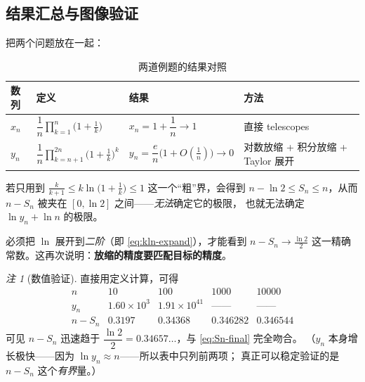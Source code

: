 \documentclass[11pt,a4paper]{ctexart}
\theoremstyle{definition}
\theoremstyle{remark}
\newtheorem*{remark}{注}
\begin{document}
\subsection{结果汇总与图像验证}

把两个问题放在一起：

\begin{table}[H]
\centering
\caption{两道例题的结果对照}
\renewcommand{\arraystretch}{1.35}
\begin{tabular}{@{}llll@{}}
\toprule
\textbf{数列} & \textbf{定义} & \textbf{结果} & \textbf{方法} \\
\midrule
$x_n$ & $\dfrac1n\displaystyle\prod_{k=1}^{n}\Big(1+\frac1k\Big)$
      & $x_n=1+\dfrac1n\to1$ & 直接 telescopes \\
$y_n$ & $\dfrac1n\displaystyle\prod_{k=n+1}^{2n}\Big(1+\frac1k\Big)^{k}$
      & $y_n=\dfrac en\big(1+O(\frac1n)\big)\to0$ & 对数放缩 + 积分放缩 + Taylor 展开 \\
\bottomrule
\end{tabular}
\end{table}

\begin{warnbox}[这道题最值得警惕的地方]
若只用到 $\frac{k}{k+1}\le k\ln\big(1+\frac1k\big)\le 1$ 这一个“粗”界，会得到
$n-\ln2\le S_n\le n$，从而 $n-S_n$ 被夹在 $[0,\ln2]$ 之间——\emph{无法}确定它的极限，
也就无法确定 $\ln y_n+\ln n$ 的极限。\par\smallskip
必须把 $\ln$ 展开到\emph{二阶}（即 \eqref{eq:kln-expand}），才能看到
$n-S_n\to\frac{\ln2}{2}$ 这一精确常数。这再次说明：\textbf{放缩的精度要匹配目标的精度}。
\end{warnbox}

\begin{remark}[数值验证]
直接用定义计算，可得
\[
  \begin{array}{c|cccc}
    n & 10 & 100 & 1000 & 10000\\ \hline
    y_n & 1.60\times10^{3} & 1.91\times10^{41} & \text{——} & \text{——}\\
    n-S_n & 0.3197 & 0.34368 & 0.346282 & 0.346544
  \end{array}
\]
可见 $n-S_n$ 迅速趋于 $\dfrac{\ln2}{2}=0.34657\ldots$，与 \eqref{eq:Sn-final} 完全吻合。
（$y_n$ 本身增长极快——因为 $\ln y_n\approx n$——所以表中只列前两项；
真正可以稳定验证的是 $n-S_n$ 这个\emph{有界}量。）
\end{remark}
\end{document}

